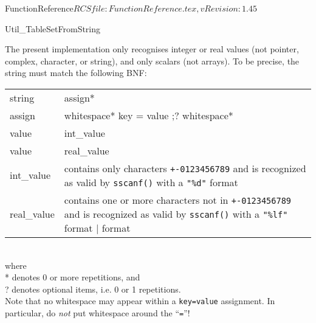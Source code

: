 \begin{cactuspart}{5}{FunctionReference}{$RCSfile: FunctionReference.tex,v $}{$Revision: 1.45 $}
\begin{FunctionDescription}{Util\_TableSetFromString}
\begin{Discussion}
The present implementation only recognises integer or real values
(not pointer, complex, character, or string), and only scalars
(not arrays).  To be precise, the string must match the following BNF:\\
\quad
\begin{tabular}{l@{\quad$\rightarrow$\quad}p{9cm}}
string & assign*                                                        \\
assign & whitespace* key = value ;? whitespace*                         \\
value  & int\_value                                                     \\
value  & real\_value                                                    \\
int\_value & contains only characters \verb|+-0123456789|
             and is recognized as valid by \verb|sscanf()| with a
             \verb|"%d"| format                                          \\
real\_value & contains one or more characters not in \verb|+-0123456789|
              and is recognized as valid by \verb|sscanf()| with a
              \verb|"%lf"| format                                        %
\end{tabular}\\
where\\[0ex]
* denotes 0 or more repetitions, and\\
? denotes optional items, i.e. 0 or 1 repetitions.\\

Note that no whitespace may appear within a \verb|key=value| assignment.
In particular, do {\em not\/} put whitespace around the ``\verb|=|''!
\end{Discussion}


\end{FunctionDescription}
\end{cactuspart}

